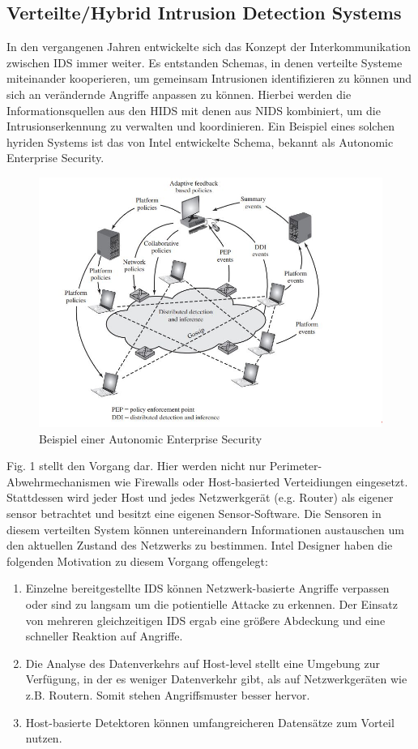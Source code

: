 \subsection{Verteilte/Hybrid Intrusion Detection Systems}
In den vergangenen Jahren entwickelte sich das Konzept der Interkommunikation zwischen IDS immer weiter. Es entstanden Schemas, in denen verteilte Systeme miteinander kooperieren, um gemeinsam Intrusionen identifizieren zu können und sich an verändernde Angriffe anpassen zu können. Hierbei werden die Informationsquellen aus den HIDS mit denen aus NIDS kombiniert, um die Intrusionserkennung zu verwalten und koordinieren.
\bigbreak
Ein Beispiel eines solchen hyriden Systems ist das von Intel entwickelte Schema, bekannt als Autonomic Enterprise Security.
\begin{figure}[h]
\center
\includegraphics[width=1\textwidth]{img/hybrid_IDS.JPG}
\caption{Beispiel einer Autonomic Enterprise Security \cite{IDS_Book_2}} \label{fig2}
\end{figure}
Fig. 1 stellt den Vorgang dar. Hier werden nicht nur Perimeter-Abwehrmechanismen wie Firewalls oder Host-basierted Verteidiungen eingesetzt. Stattdessen wird jeder Host und jedes Netzwerkgerät (e.g. Router) als eigener sensor betrachtet und besitzt eine eigenen Sensor-Software. Die Sensoren in diesem verteilten System können untereinandern Informationen austauschen um den aktuellen Zustand des Netzwerks zu bestimmen.\cite{IDS_Book_2}
Intel Designer haben die folgenden Motivation zu diesem Vorgang offengelegt:

\begin{enumerate}
    \item Einzelne bereitgestellte IDS können Netzwerk-basierte Angriffe verpassen oder sind zu langsam um die potientielle Attacke zu erkennen. Der Einsatz von mehreren gleichzeitigen IDS ergab eine größere Abdeckung und eine schneller Reaktion auf Angriffe.\bigbreak
    \item Die Analyse des Datenverkehrs auf Host-level stellt eine Umgebung zur Verfügung, in der es weniger Datenverkehr gibt, als auf Netzwerkgeräten wie z.B. Routern. Somit stehen Angriffsmuster besser hervor.\bigbreak
    \item Host-basierte Detektoren können umfangreicheren Datensätze zum Vorteil nutzen. \bigbreak
\end{enumerate}
